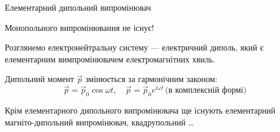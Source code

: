 \documentclass[onlytextwidth]{beamer}
\let\vect\vec
\begin{document}
\fi


\begin{frame}{Елементарний дипольний випромінювач}{}
	\begin{alertblock}{}\centering
		Монопольного випромінювання не існує!
	\end{alertblock}

	Розглянемо електронейтральну систему --- електричний диполь, який є елементарним вимпромінювачем електромагнітних хвиль.
	\begin{center}
\begin{pict}
\end{pict}
	\end{center}

	Дипольний момент $ \vect{p} $ змінюється за гармонічним законом:
	\begin{equation*}
		\vect{p} = \vect{p}_0 \cos\omega t, \quad 	\vect{p} = \vect{p}_0e^{i\omega t}\, \text{(в комплексній формі)}
	\end{equation*}

	\begin{block}{}
		Крім елементарного дипольного випромінювача ще існують елементарний магніто-дипольний випромінювач, квадрупольний \ldots
	\end{block}
\end{frame}
\end{document}
